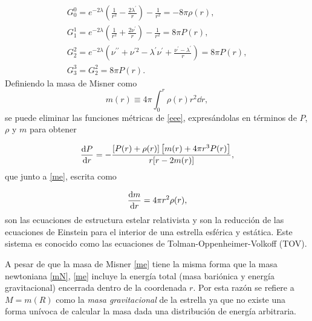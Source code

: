 \begin{equation}
    \begin{array} { l } { G _ { 0 } ^ { 0 } = e ^ { - 2 \lambda } \left( \frac { 1 } { r ^ { 2 } } - \frac { 2 \lambda ^ { \prime } } { r } \right) - \frac { 1 } { r ^ { 2 } } = - 8 \pi  \rho ( r ) }, \\ { G _ { 1 } ^ { 1 } = e ^ { - 2 \lambda } \left( \frac { 1 } { r ^ { 2 } } + \frac { 2 \nu ^ { \prime } } { r } \right) - \frac { 1 } { r ^ { 2 } } = 8 \pi  P ( r ) }, \\ { G _ { 2 } ^ { 2 } = e ^ { - 2 \lambda } \left( \nu ^ { \prime \prime } + \nu ^ { \prime 2 } - \lambda ^ { \prime } \nu ^ { \prime } + \frac { \nu ^ { \prime } - \lambda ^ { \prime } } { r } \right) = 8 \pi  P ( r ) }, \\ { G _ { 3 } ^ { 3 } = G _ { 2 } ^ { 2 } = 8 \pi  P ( r ) }. \end{array}
    \label{eee}
\end{equation}
Definiendo la masa de Misner como
\begin{equation}
    m ( r ) \equiv 4 \pi \int _ { 0 } ^ { r } \rho ( r ) r ^ { 2 } \dd{r},
    \label{me}
\end{equation}
se puede eliminar las funciones métricas de \eqref{eee}, expresándolas en términos de $P$, $\rho$ y $m$  para obtener 

\begin{equation}
    \dv{P}{r} = - \frac { [ P ( r ) + \rho ( r ) ] \left[ m ( r ) + 4 \pi r ^ { 3 } P ( r ) \right] } { r [ r - 2 m ( r ) ] },
    \label{dptov}
\end{equation}
que junto a \eqref{me}, escrita como

\begin{equation}
    \dv{m}{r} = 4 \pi r ^ { 2 } \rho(r),
    \label{dmtov}
\end{equation}
son las ecuaciones de estructura estelar relativista y son la reducción de las ecuaciones de Einstein para el interior de una estrella esférica y estática. Este sistema es conocido como las ecuaciones de Tolman-Oppenheimer-Volkoff (TOV).

A pesar de que la masa de Misner \eqref{me} tiene la misma forma que la masa newtoniana \eqref{mN}, \eqref{me} incluye la energía total (masa bariónica y energía gravitacional) encerrada dentro de la coordenada $r$. Por esta razón se refiere a $M=m(R)$ como la \emph{masa gravitacional} de la estrella ya que no existe una forma unívoca de calcular la masa dada una distribución de energía arbitraria. 

